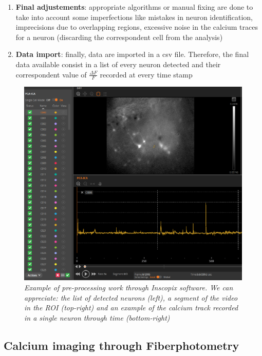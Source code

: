 \documentclass[a4paper]{article}
\begin{document}
\begin{enumerate}
	\item \textbf{Final adjustements}: appropriate algorithms or manual fixing are done to take into account some imperfections like mistakes in neuron identification, imprecisions due to overlapping regions, excessive noise in the calcium traces for a neuron (discarding the correspondent cell from the analysis)
	
	\item \textbf{Data import}: finally, data are imported in a csv file. Therefore, the final data available consist in a list of every neuron detected and their correspondent value of $\frac{\Delta F }{F}$ recorded at every time stamp
	
\end{enumerate} 
	
\begin{figure}[H]
	\begin{center}
		\includegraphics[scale=.70]{Inscopix2.png} 
	\end{center} 
	\caption{\textit{Example of pre-processing work through Inscopix software. We can appreciate: the list of detected neurons (left), a segment of the video in the ROI (top-right) and an example of the calcium track recorded in a single neuron through time (bottom-right)}}
	
\end{figure}

\newpage
\subsection{Calcium imaging through Fiberphotometry}
\end{document}

